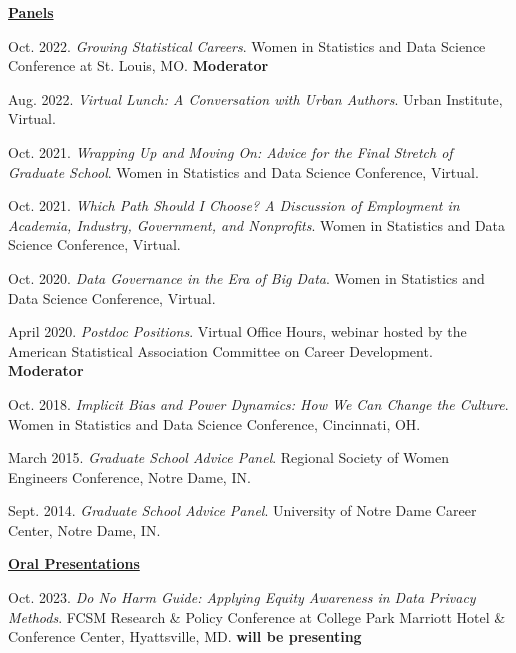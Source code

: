 \underline{\textbf{\large Panels}}\normalsize
\vspace{4pt}
\begin{etaremune}[topsep=0pt, itemsep=4pt, partopsep=0pt, parsep=0pt]
    
    \item Oct. 2022. \textit{Growing Statistical Careers}. Women in Statistics and Data Science Conference at St. Louis, MO. \textbf{Moderator}
    
    \item Aug. 2022. \textit{Virtual Lunch: A Conversation with Urban Authors}. Urban Institute, Virtual.
    
    \item Oct. 2021. \textit{Wrapping Up and Moving On: Advice for the Final Stretch of Graduate School}. Women in Statistics and Data Science Conference, Virtual.
    
    \item Oct. 2021. \textit{Which Path Should I Choose? A Discussion of Employment in Academia, Industry, Government, and Nonprofits}. Women in Statistics and Data Science Conference, Virtual.
    
    \item Oct. 2020. \textit{Data Governance in the Era of Big Data}. Women in Statistics and Data Science Conference, Virtual.
    
    \item April 2020. \textit{Postdoc Positions}. Virtual Office Hours, webinar hosted by the American Statistical Association Committee on Career Development. \textbf{Moderator}
    
    \item Oct. 2018. \textit{Implicit Bias and Power Dynamics: How We Can Change the Culture}. Women in Statistics and Data Science Conference, Cincinnati, OH.

    \item March 2015. \textit{Graduate School Advice Panel}.  Regional Society of Women Engineers Conference, Notre Dame, IN.
    
    \item Sept. 2014. \textit{Graduate School Advice Panel}.  University of Notre Dame Career Center, Notre Dame, IN.
    
\vspace{6pt}
\hspace{-0.30in}\underline{\textbf{\large Oral Presentations}}\normalsize
    \item Oct. 2023. \textit{Do No Harm Guide: Applying Equity Awareness in Data Privacy Methods}. FCSM Research \& Policy Conference at College Park Marriott Hotel \& Conference Center, Hyattsville, MD. \textbf{will be presenting}
    

\end{etaremune}
